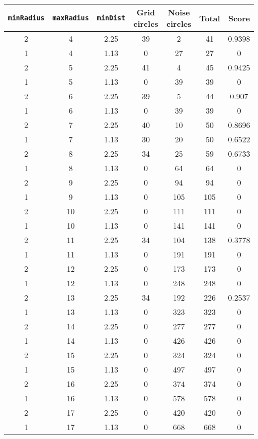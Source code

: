 \documentclass[letterpaper, 12pt]{article}
\begin{document}
\begin{longtable}{|c|c|c|c|c|c|c|}
\hline
\textbf{\texttt{minRadius}} & \textbf{\texttt{maxRadius}} & \textbf{\texttt{minDist}} & \textbf{Grid circles} & \textbf{Noise circles} & \textbf{Total} & \textbf{Score} \\
\hline
2 & 4 & 2.25 & 39 & 2 & 41 & 0.9398 \\
\hline
1 & 4 & 1.13 & 0 & 27 & 27 & 0 \\
\hline
2 & 5 & 2.25 & 41 & 4 & 45 & 0.9425 \\
\hline
1 & 5 & 1.13 & 0 & 39 & 39 & 0 \\
\hline
2 & 6 & 2.25 & 39 & 5 & 44 & 0.907 \\
\hline
1 & 6 & 1.13 & 0 & 39 & 39 & 0 \\
\hline
2 & 7 & 2.25 & 40 & 10 & 50 & 0.8696 \\
\hline
1 & 7 & 1.13 & 30 & 20 & 50 & 0.6522 \\
\hline
2 & 8 & 2.25 & 34 & 25 & 59 & 0.6733 \\
\hline
1 & 8 & 1.13 & 0 & 64 & 64 & 0 \\
\hline
2 & 9 & 2.25 & 0 & 94 & 94 & 0 \\
\hline
1 & 9 & 1.13 & 0 & 105 & 105 & 0 \\
\hline
2 & 10 & 2.25 & 0 & 111 & 111 & 0 \\
\hline
1 & 10 & 1.13 & 0 & 141 & 141 & 0 \\
\hline
2 & 11 & 2.25 & 34 & 104 & 138 & 0.3778 \\
\hline
1 & 11 & 1.13 & 0 & 191 & 191 & 0 \\
\hline
2 & 12 & 2.25 & 0 & 173 & 173 & 0 \\
\hline
1 & 12 & 1.13 & 0 & 248 & 248 & 0 \\
\hline
2 & 13 & 2.25 & 34 & 192 & 226 & 0.2537 \\
\hline
1 & 13 & 1.13 & 0 & 323 & 323 & 0 \\
\hline
2 & 14 & 2.25 & 0 & 277 & 277 & 0 \\
\hline
1 & 14 & 1.13 & 0 & 426 & 426 & 0 \\
\hline
2 & 15 & 2.25 & 0 & 324 & 324 & 0 \\
\hline
1 & 15 & 1.13 & 0 & 497 & 497 & 0 \\
\hline
2 & 16 & 2.25 & 0 & 374 & 374 & 0 \\
\hline
1 & 16 & 1.13 & 0 & 578 & 578 & 0 \\
\hline
2 & 17 & 2.25 & 0 & 420 & 420 & 0 \\
\hline
1 & 17 & 1.13 & 0 & 668 & 668 & 0 \\

\end{longtable}
\end{document}
